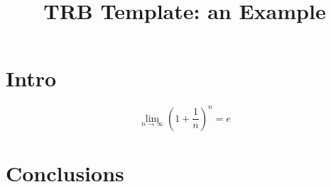 \documentclass[12pt]{trbart}
\title{TRB Template: an Example}
\author{}
\date{}
\begin{document}
\maketitle

\section{Intro}
\lipsum[2]

\[ \lim_{n\to \infty} \left(1 + \frac{1}{n}\right)^n = e \]

\lipsum[1]

\section{Conclusions}

\lipsum[1]
\end{document}
